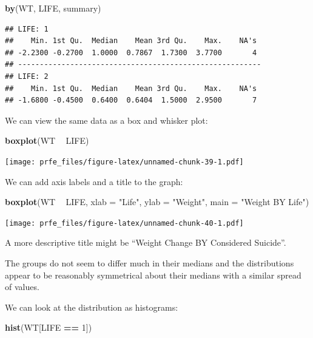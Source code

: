 \documentclass[]{book}
\newenvironment{Shaded}{\begin{snugshade}}{\end{snugshade}}
\newcommand{\KeywordTok}[1]{\textcolor[rgb]{0.13,0.29,0.53}{\textbf{#1}}}
\newcommand{\DataTypeTok}[1]{\textcolor[rgb]{0.13,0.29,0.53}{#1}}
\newcommand{\DecValTok}[1]{\textcolor[rgb]{0.00,0.00,0.81}{#1}}
\newcommand{\StringTok}[1]{\textcolor[rgb]{0.31,0.60,0.02}{#1}}
\newcommand{\OperatorTok}[1]{\textcolor[rgb]{0.81,0.36,0.00}{\textbf{#1}}}
\newcommand{\NormalTok}[1]{#1}
\theoremstyle{definition}
\theoremstyle{definition}
\theoremstyle{definition}
\theoremstyle{remark}
\begin{document}
\begin{Shaded}
\begin{Highlighting}[]
\KeywordTok{by}\NormalTok{(WT, LIFE, summary)}
\end{Highlighting}
\end{Shaded}

\begin{verbatim}
## LIFE: 1
##    Min. 1st Qu.  Median    Mean 3rd Qu.    Max.    NA's 
## -2.2300 -0.2700  1.0000  0.7867  1.7300  3.7700       4 
## -------------------------------------------------------- 
## LIFE: 2
##    Min. 1st Qu.  Median    Mean 3rd Qu.    Max.    NA's 
## -1.6800 -0.4500  0.6400  0.6404  1.5000  2.9500       7
\end{verbatim}

We can view the same data as a box and whisker plot:

\begin{Shaded}
\begin{Highlighting}[]
\KeywordTok{boxplot}\NormalTok{(WT }\OperatorTok{~}\StringTok{ }\NormalTok{LIFE)}
\end{Highlighting}
\end{Shaded}

\texttt{[image: prfe\_files/figure-latex/unnamed-chunk-39-1.pdf]}

We can add axis labels and a title to the graph:

\begin{Shaded}
\begin{Highlighting}[]
\KeywordTok{boxplot}\NormalTok{(WT }\OperatorTok{~}\StringTok{ }\NormalTok{LIFE,}
        \DataTypeTok{xlab =} \StringTok{"Life"}\NormalTok{,}
        \DataTypeTok{ylab =} \StringTok{"Weight"}\NormalTok{,}
        \DataTypeTok{main =} \StringTok{"Weight BY Life"}\NormalTok{)}
\end{Highlighting}
\end{Shaded}

\texttt{[image: prfe\_files/figure-latex/unnamed-chunk-40-1.pdf]}

A more descriptive title might be ``Weight Change BY Considered
Suicide''.

The groups do not seem to differ much in their medians and the
distributions appear to be reasonably symmetrical about their medians
with a similar spread of values.

We can look at the distribution as histograms:

\begin{Shaded}
\begin{Highlighting}[]
\KeywordTok{hist}\NormalTok{(WT[LIFE }\OperatorTok{==}\StringTok{ }\DecValTok{1}\NormalTok{])}
\end{Highlighting}
\end{Shaded}
\end{document}
